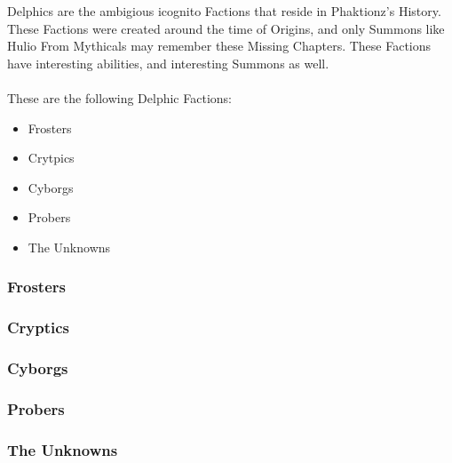 Delphics are the ambigious icognito Factions that reside in Phaktionz's History. These Factions 
were created around the time of Origins, and only Summons like Hulio From Mythicals may remember 
these Missing Chapters. These Factions have interesting abilities, and interesting Summons as well. 
\\\\
These are the following Delphic Factions: 
\begin{itemize}
    \item Frosters
    \item Crytpics 
    \item Cyborgs 
    \item Probers
    \item The Unknowns 
\end{itemize}

\subsubsection*{Frosters}

\subsubsection*{Cryptics}

\subsubsection*{Cyborgs}

\subsubsection*{Probers}

\subsubsection*{The Unknowns}